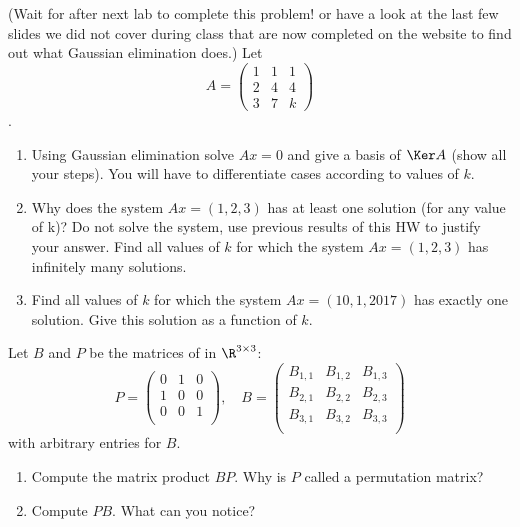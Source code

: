 \documentclass[11pt,nocut]{article}
\begin{document}
\begin{problem}[3 points] (Wait for after next lab to complete this problem! or have a look at the last few slides  we did not cover during class that are now completed on the website to find out what Gaussian elimination does.)
Let $$A = \left(\begin{matrix} 1 & 1 & 1 \\
	2 & 4 & 4 \\
	3 & 7 & k
	\end{matrix}\right)$$.
		\begin{enumerate}[label=\normalfont(\textbf{\alph*})]
		  \item Using Gaussian elimination  solve $Ax = 0$ and give a basis of $\Ker A$ (show all your steps). You will have to differentiate cases according to values of $k$.
		  \item Why does the system $A x = (1,2,3)$ has at least one solution (for any value of k)? Do not solve the system, use previous results of this HW to justify your answer. Find all values of $k$ for which the system $A x = (1,2,3)$ has infinitely many solutions. 
		  \item Find all values of $k$ for which the system $A x = (10, 1, 2017)$ has exactly one solution. Give this solution as a function of $k$.
	\end{enumerate}
\end{problem}

\begin{problem}[2 points]
	Let $B$ and $P$ be the matrices of in $\R^{3 \times 3}$:
	$$
	P = 
	\begin{pmatrix}
		0 & 1 & 0\\
		1 & 0 & 0\\
		0 & 0 & 1\\
	\end{pmatrix},
	\quad
	B = 
	\begin{pmatrix}
		B_{1,1} & B_{1,2} & B_{1,3}\\
		B_{2,1} & B_{2,2} & B_{2,3}\\
		B_{3,1} & B_{3,2} & B_{3,3}\\
	\end{pmatrix}
	$$
	with arbitrary entries for $B$.
	\begin{enumerate}[label=\normalfont(\textbf{\alph*})]
		\item Compute the matrix product $BP$. Why is $P$ called a permutation matrix?
		\item Compute $PB$. What can you notice?
	\end{enumerate}	
\end{problem}
\vspace{5mm}
\end{document}

